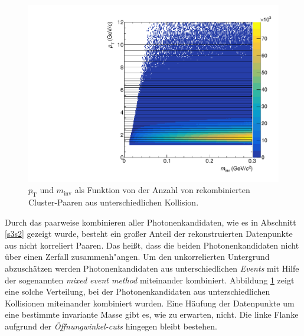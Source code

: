 \begin{figure}[tp]
\centering
\includegraphics[width=.7\linewidth]{hInvMass_pT_Bkg.pdf}
\caption{$p_\text{T}$ und $m_\text{inv}$ als Funktion von der Anzahl von rekombinierten  Cluster-Paaren aus unterschiedlichen Kollision.}
\label{figInvMassPt_b}
\end{figure}
Durch das paarweise kombinieren aller Photonenkandidaten, wie es in Abschnitt \ref{s3s2} gezeigt wurde, besteht ein gro{\ss}er Anteil der rekonstruierten Datenpunkte aus nicht korreliert Paaren.
Das hei{\ss}t, dass die beiden Photonenkandidaten nicht \"uber einen Zerfall zusammenh{"a}ngen.
Um den unkorrelierten Untergrund abzusch\"atzen werden Photonenkandidaten aus unterschiedlichen \textit{Events} mit Hilfe der sogenannten \textit{mixed event method} miteinander kombiniert.
Abbildung \ref{figInvMassPt_b} zeigt eine solche Verteilung, bei der Photonenkandidaten aus unterschiedlichen Kollisionen miteinander kombiniert wurden.
Eine H\"aufung der Datenpunkte um eine bestimmte invariante Masse gibt es, wie zu erwarten, nicht.
Die linke Flanke aufgrund der \textit{\"Offnungwinkel-cuts} hingegen bleibt bestehen.
\newline
